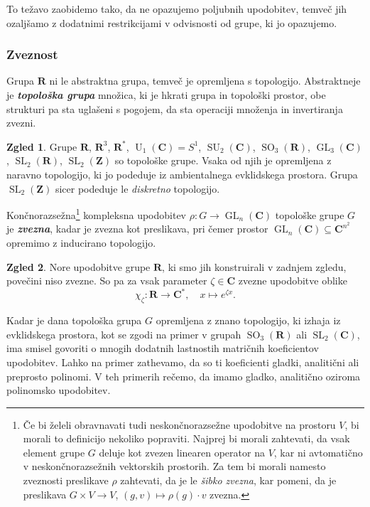 \documentclass[11pt]{book}
\def\ZZ{\mathbf{Z}}
\def\RR{\mathbf{R}}
\def\CC{\mathbf{C}}
\DeclareMathOperator\SU{SU}
\DeclareMathOperator\GL{GL}
\DeclareMathOperator\U{U}
\DeclareMathOperator\SL{SL}
\DeclareMathOperator\SO{SO}
\def\definicija{\color{rdeca}\bf\em}
\theoremstyle{definition}
\theoremstyle{zgled}
\newtheorem*{zgled}{Zgled}
\theoremstyle{odprtproblem}
\theoremstyle{domacanaloga}
\theoremstyle{izrek}
\begin{document}
To težavo zaobidemo tako, da ne opazujemo poljubnih upodobitev, temveč jih ozaljšamo z dodatnimi restrikcijami v odvisnosti od grupe, ki jo opazujemo. 

\subsubsection{Zveznost}

Grupa $\RR$ ni le abstraktna grupa, temveč je opremljena s topologijo. Abstraktneje je {\definicija topološka grupa} množica, ki je hkrati grupa in topološki prostor, obe strukturi pa sta uglašeni s pogojem, da sta operaciji množenja in invertiranja zvezni. 

\begin{zgled}
Grupe $\RR$, $\RR^3$, $\RR^*$, $\U_1(\CC) = S^1$, $\SU_2(\CC)$, $\SO_3(\RR)$, $\GL_3(\CC)$, $\SL_2(\RR)$, $\SL_2(\ZZ)$ so topološke grupe. Vsaka od njih je opremljena z naravno topologijo, ki jo podeduje iz ambientalnega evklidskega prostora. Grupa $\SL_2(\ZZ)$ sicer podeduje le \emph{diskretno} topologijo.
\end{zgled}

Končnorazsežna\footnote{Če bi želeli obravnavati tudi neskončnorazsežne upodobitve na prostoru $V$, bi morali to definicijo nekoliko popraviti. Najprej bi morali zahtevati, da vsak element grupe $G$ deluje kot zvezen linearen operator na $V$, kar ni avtomatično v neskončnorazsežnih vektorskih prostorih. Za tem bi morali namesto zveznosti preslikave $\rho$ zahtevati, da je le \emph{šibko zvezna}, kar pomeni, da je preslikava $G \times V \to V$, $(g,v) \mapsto \rho(g) \cdot v$ zvezna.} kompleksna upodobitev $\rho \colon G \to \GL_n(\CC)$ topološke grupe $G$ je {\definicija zvezna}, kadar je zvezna kot preslikava, pri čemer prostor $\GL_n(\CC) \subseteq \CC^{n^2}$ opremimo z inducirano topologijo.

\begin{zgled}
Nore upodobitve grupe $\RR$, ki smo jih konstruirali v zadnjem zgledu, povečini niso zvezne. So pa za vsak parameter $\zeta \in \CC$ zvezne upodobitve oblike
\[
    \chi_{\zeta} \colon \RR \to \CC^*, \quad
    x \mapsto e^{\zeta x}.
\]
\end{zgled}

Kadar je dana topološka grupa $G$ opremljena z znano topologijo, ki izhaja iz evklidskega prostora, kot se zgodi na primer v grupah $\SO_3(\RR)$ ali $\SL_2(\CC)$, ima smisel govoriti o mnogih dodatnih lastnostih matričnih koeficientov upodobitev. Lahko na primer zathevamo, da so ti koeficienti gladki, analitični ali preprosto polinomi. V teh primerih rečemo, da imamo gladko, analitično oziroma polinomsko upodobitev.
\end{document}
